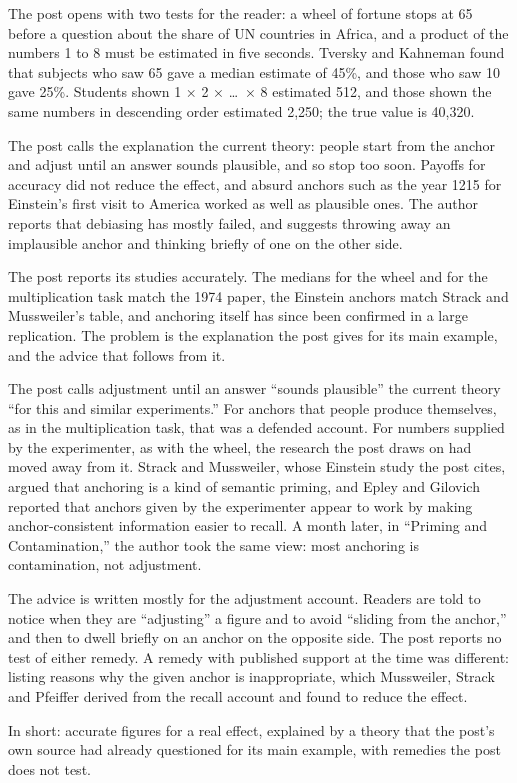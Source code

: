 \begin{afterword}
\summaryhead

The post opens with two tests for the reader: a wheel of fortune stops at 65 before a question about the share of UN countries in Africa, and a product of the numbers 1 to 8 must be estimated in five seconds. Tversky and Kahneman found that subjects who saw 65 gave a median estimate of 45\%, and those who saw 10 gave 25\%. Students shown 1 × 2 × \ldots\ × 8 estimated 512, and those shown the same numbers in descending order estimated 2,250; the true value is 40,320.

The post calls the explanation the current theory: people start from the anchor and adjust until an answer sounds plausible, and so stop too soon. Payoffs for accuracy did not reduce the effect, and absurd anchors such as the year 1215 for Einstein's first visit to America worked as well as plausible ones. The author reports that debiasing has mostly failed, and suggests throwing away an implausible anchor and thinking briefly of one on the other side.

\responsehead

The post reports its studies accurately. The medians for the wheel and for the multiplication task match the 1974 paper, the Einstein anchors match Strack and Mussweiler's table, and anchoring itself has since been confirmed in a large replication. The problem is the explanation the post gives for its main example, and the advice that follows from it.

The post calls adjustment until an answer ``sounds plausible'' the current theory ``for this and similar experiments.'' For anchors that people produce themselves, as in the multiplication task, that was a defended account. For numbers supplied by the experimenter, as with the wheel, the research the post draws on had moved away from it. Strack and Mussweiler, whose Einstein study the post cites, argued that anchoring is a kind of semantic priming, and Epley and Gilovich reported that anchors given by the experimenter appear to work by making anchor-consistent information easier to recall. A month later, in ``Priming and Contamination,'' the author took the same view: most anchoring is contamination, not adjustment.

The advice is written mostly for the adjustment account. Readers are told to notice when they are ``adjusting'' a figure and to avoid ``sliding from the anchor,'' and then to dwell briefly on an anchor on the opposite side. The post reports no test of either remedy. A remedy with published support at the time was different: listing reasons why the given anchor is inappropriate, which Mussweiler, Strack and Pfeiffer derived from the recall account and found to reduce the effect.

In short: accurate figures for a real effect, explained by a theory that the post's own source had already questioned for its main example, with remedies the post does not test.
\end{afterword}
